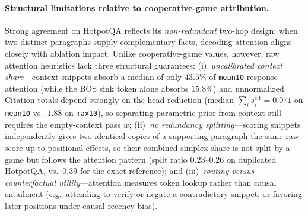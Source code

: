 \paragraph{Structural limitations relative to cooperative-game attribution.}
Strong agreement on HotpotQA reflects its \emph{non-redundant} two-hop design: when two distinct paragraphs supply complementary facts, decoding attention aligns closely with ablation impact. Unlike cooperative-game values, however, raw attention heuristics lack three structural guarantees: (i)~\emph{uncalibrated context share}---context snippets absorb a median of only $43.5\%$ of \texttt{mean10} response attention (while the BOS sink token alone absorbs $15.8\%$) and unnormalized Citation totals depend strongly on the head reduction (median $\sum_i s_i^{\text{cit}} = 0.071$ on \texttt{mean10} vs.\ $1.88$ on \texttt{max10}), so separating parametric prior from context still requires the empty-context pass $w$; (ii)~\emph{no redundancy splitting}---scoring snippets independently gives two identical copies of a supporting paragraph the same raw score up to positional effects, so their combined simplex share is not split by a game but follows the attention pattern (split ratio $0.23$--$0.26$ on duplicated HotpotQA, vs.\ $0.39$ for the exact reference); and (iii)~\emph{routing versus counterfactual utility}---attention measures token lookup rather than causal entailment (e.g.\ attending to verify or negate a contradictory snippet, or favoring later positions under causal recency bias).